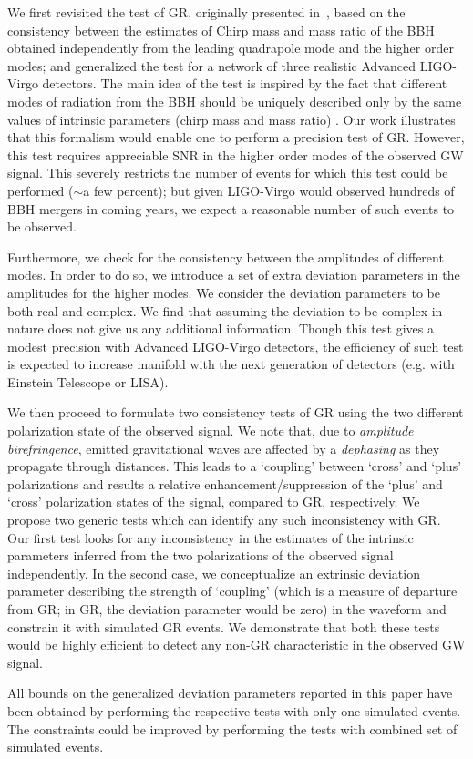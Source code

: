 \documentclass[prd,preprintnumbers,twocolumn,eqsecnum,floatfix,a4paper,nofootinbib,superscriptaddress]{revtex4}
\begin{document}
We first revisited the test of GR, originally presented in~\cite{dhanpal2018}, based on the consistency between the estimates of Chirp mass and mass ratio of the BBH obtained independently from the leading quadrapole mode and the higher order modes; and generalized the test for a network of three realistic Advanced LIGO-Virgo detectors. The main idea of the test is inspired by the fact that different modes of radiation from the BBH should be uniquely described only by the same values of intrinsic parameters (chirp mass and mass ratio) . Our work illustrates that this formalism would enable one to perform a precision test of GR. However, this test requires appreciable SNR in the higher order modes of the observed GW signal. This severely restricts the number of events for which this test could be performed ($\sim$a few percent); but given LIGO-Virgo would observed hundreds of BBH mergers in coming years, we expect a reasonable number of such events to be observed.

Furthermore, we check for the consistency between the amplitudes of different modes. In order to do so, we introduce a set of extra deviation parameters in the amplitudes for the higher modes. We consider the deviation parameters to be both real and complex. We find that assuming the deviation to be complex in nature does not give us any additional information. Though this test gives a modest precision with Advanced LIGO-Virgo detectors, the efficiency of such test is expected to increase manifold with the next generation of detectors (e.g. with Einstein Telescope or LISA). 

We then proceed to formulate two consistency tests of GR using the two different polarization state of the observed signal. We note that, due to \textit{amplitude birefringence}, emitted gravitational waves are affected by a \textit{dephasing} as they propagate through distances. This leads to a `coupling' between `cross' and `plus' polarizations and results a relative enhancement/suppression of the `plus' and `cross' polarization states of the signal, compared to GR,  respectively. We propose two generic tests which can identify any such inconsistency with GR. Our first test  looks for any inconsistency in the estimates of the intrinsic parameters inferred from the two polarizations of the observed signal independently. In the second case, we conceptualize an extrinsic deviation parameter describing the strength of `coupling' (which is a measure of departure from GR; in GR, the deviation parameter would be zero) in the waveform and constrain it with simulated GR events. We demonstrate that both these tests would be highly efficient to detect any non-GR characteristic in the observed GW signal. 

All bounds on the generalized deviation parameters reported in this paper have been obtained by performing the respective tests with only one simulated events. The constraints could be improved by performing the tests with combined set of simulated events.  
\newpage


\end{document}
